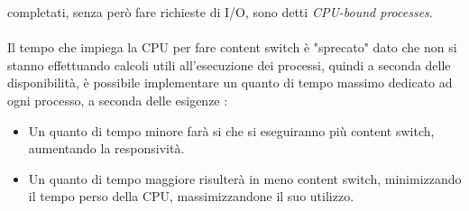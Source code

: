 \documentclass[12pt, letterpaper]{article}
\begin{document}
completati, senza però fare richieste di I/O, sono detti \textit{CPU-bound processes}.
\\\hphantom{}\\ 
Il tempo che impiega la CPU per fare content switch è "sprecato" dato che non si stanno effettuando 
calcoli utili all'esecuzione dei processi, quindi a seconda delle disponibilità, è possibile implementare 
un quanto di tempo massimo dedicato ad ogni processo, a seconda delle esigenze :\begin{itemize}
    \item Un quanto di tempo minore farà si che si eseguiranno più content switch, aumentando la responsività.
    \item Un quanto di tempo maggiore risulterà in meno content switch, minimizzando il tempo perso della CPU, massimizzandone
    il suo utilizzo.
\end{itemize}
\end{document}
